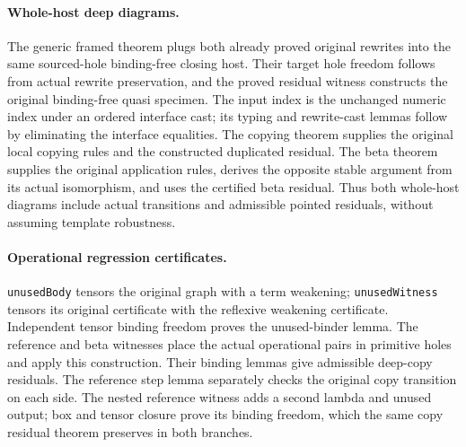 \paragraph{Whole-host deep diagrams.}
The generic framed theorem plugs both already proved original rewrites
into the same sourced-hole binding-free closing host. Their target hole
freedom follows from actual rewrite preservation, and the proved residual
witness constructs the original binding-free quasi specimen. The input
index is the unchanged numeric index under an ordered interface cast;
its typing and rewrite-cast lemmas follow by eliminating the interface
equalities. The copying theorem supplies the original local copying rules
and the constructed duplicated residual. The beta theorem supplies the
original application rules, derives the opposite stable argument from
its actual isomorphism, and uses the certified beta residual. Thus both
whole-host diagrams include actual transitions and admissible pointed
residuals, without assuming template robustness.

\par{}

\paragraph{Operational regression certificates.}
\texttt{unusedBody} tensors the original graph with a term weakening;
\texttt{unusedWitness} tensors its original certificate with the reflexive
weakening certificate. Independent tensor binding freedom proves the
unused-binder lemma. The reference and beta witnesses place the actual
operational pairs in primitive holes and apply this construction. Their
binding lemmas give admissible deep-copy residuals. The reference step
lemma separately checks the original copy transition on each side.
The nested reference witness adds a second lambda and unused output;
box and tensor closure prove its binding freedom, which the same copy
residual theorem preserves in both branches.

